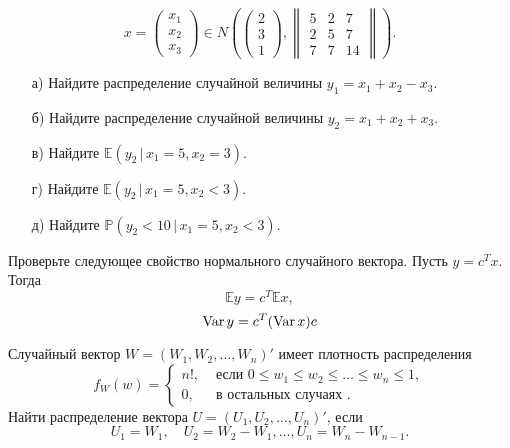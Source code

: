 \begin{comment}
Докажите следующие утверждения:

\begin{enumerate}
\item $X-c_1 Y_1-\ldots-c_n Y_n, Y_1,\ldots, Y_n$ - независимы.
\item $X-c_1 Y_1-\ldots-c_n Y_n$ ортогонален подпространству $H$ пространства $L_2$ всевозможных борелевских функций $\varphi(Y_1,\ldots,Y_n)\in L_2$.
\end{enumerate}
 
\end{ordre}

\end{comment}

\begin{problem}
$$
x=\begin{pmatrix}
x_1\\
x_2\\
x_3
\end{pmatrix}
\in N\left(
\begin{pmatrix}
2\\
3\\
1
\end{pmatrix}, 
\begin{Vmatrix}
5 & 2 & 7\\
2 & 5 & 7\\
7 & 7 & 14
\end{Vmatrix}
\right) . 
$$
\begin{enumerate}
\item[а)] Найдите распределение случайной величины $y_1=x_1+x_2-x_3$. 
\item[б)] Найдите распределение случайной величины $y_2=x_1+x_2+x_3$. 
\item[в)] Найдите ${\mathbb E}(y_2\, |\, x_1=5, x_2=3)$. 
\item[г)] Найдите ${\mathbb E}(y_2\, |\, x_1=5, x_2<3)$. 
\item[д)] Найдите ${\mathbb P}(y_2<10\, |\, x_1=5, x_2<3)$. 
\end{enumerate}
\end{problem}

\begin{ordre}
Проверьте следующее свойство нормального случайного вектора.
Пусть $y=c^Tx$. Тогда 
$$
{\mathbb E}y=c^T{\mathbb E}x, 
$$
$$
\mathop{\mathrm{Var}}\nolimits y=c^T (\mathop{\mathrm{Var}}\nolimits x) c 
$$
\end{ordre}



\begin{problem}
Случайный вектор $W=(W_1, W_2, \ldots, W_n)'$ имеет плотность распределения 
$$
f_W(w)=\begin{cases}
n! , & \text{ если } 0\leqslant w_1\leqslant w_2\leqslant \ldots \leqslant w_n\leqslant 1, \\
0, & \text{ в остальных случаях }. 
\end{cases}
$$
Найти распределение вектора $U=(U_1, U_2, \ldots, U_n)'$, если 
$$
U_1=W_1, \quad U_2=W_2-W_1, \ldots, U_n=W_n-W_{n-1} . 
$$
\end{problem}

